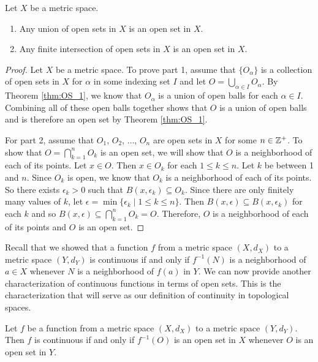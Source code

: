 \begin{theorem} Let $X$ be a metric space.
\begin{enumerate}
\item Any union of open sets in $X$ is an open set in $X$.
\item Any finite intersection of open sets in $X$ is an open set in $X$. 
\end{enumerate}
\end{theorem}

\begin{proof} Let $X$ be a metric space. To prove part 1, assume that $\{O_{\alpha}\}$ is a collection of open sets in $X$ for $\alpha$ in some indexing set $I$ and let $O = \bigcup_{\alpha \in I} O_{\alpha}$. By Theorem \ref{thm:OS_1}, we know that $O_{\alpha}$ is a union of open balls for each $\alpha \in I$. Combining all of these open balls together shows that $O$ is a union of open balls and is therefore an open set by Theorem \ref{thm:OS_1}. 

For part 2, assume that $O_1$, $O_2$, $\ldots$, $O_n$ are open sets in $X$ for some $n \in \mathbb{Z}^+$. To show that $O = \bigcap_{k=1}^n O_k$ is an open set, we will show that $O$ is a neighborhood of each of its points. Let $x \in O$. Then $x \in O_k$ for each $1 \leq k \leq n$. Let $k$ be between 1 and $n$. Since $O_k$ is open, we know that $O_k$ is a neighborhood of each of its points. So there exists $\epsilon_k > 0$ such that $B(x, \epsilon_k) \subseteq O_k$. Since there are only finitely many values of $k$, let $\epsilon = \min\{\epsilon_k \mid 1 \leq k \leq n\}$. Then $B(x, \epsilon) \subseteq B(x, \epsilon_k)$ for each $k$ and so $B(x, \epsilon) \subseteq \bigcap_{k=1}^n O_k = O$. Therefore, $O$ is a neighborhood of each of its points and $O$ is an open set.
\end{proof}


\label{sec_cont_open_sets}
Recall that we showed that a function $f$ from a metric space $(X,d_X)$ to a metric space $(Y,d_Y)$ is continuous if and only if $f^{-1}(N)$ is a neighborhood of $a \in X$ whenever $N$ is a neighborhood of $f(a)$ in $Y$. We can now provide another characterization of continuous functions in terms of open sets. This is the characterization that will serve as our definition of continuity in topological spaces.

\begin{theorem} \label{thm:Open_continuity} Let $f$ be a function from a metric space $(X,d_X)$ to a metric space $(Y,d_Y)$. Then $f$ is continuous if and only if $f^{-1}(O)$ is an open set in $X$ whenever $O$ is an open set in $Y$.  
\end{theorem}

